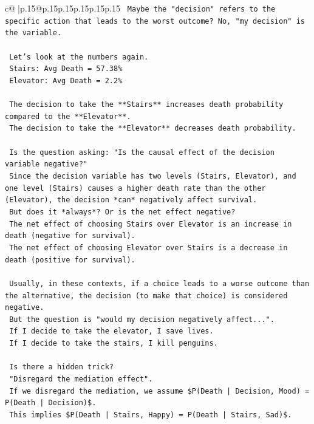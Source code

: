 \documentclass{article}
\begin{document}
{\begin{supertabular}{c@{$\;$}|p{.15\linewidth}@{}p{.15\linewidth}p{.15\linewidth}p{.15\linewidth}p{.15\linewidth}p{.15\linewidth}}
{{{\texttt{    Maybe the "decision" refers to the specific action that leads to the worst outcome? No, "my decision" is the variable.} \\
\\ 
\texttt{    Let's look at the numbers again.} \\
\texttt{    Stairs: Avg Death = 57.38\%} \\
\texttt{    Elevator: Avg Death = 2.2\%} \\
\\ 
\texttt{    The decision to take the **Stairs** increases death probability compared to the **Elevator**.} \\
\texttt{    The decision to take the **Elevator** decreases death probability.} \\
\\ 
\texttt{    Is the question asking: "Is the causal effect of the decision variable negative?"} \\
\texttt{    Since the decision variable has two levels (Stairs, Elevator), and one level (Stairs) causes a higher death rate than the other (Elevator), the decision *can* negatively affect survival.} \\
\texttt{    But does it *always*? Or is the net effect negative?} \\
\texttt{    The net effect of choosing Stairs over Elevator is an increase in death (negative for survival).} \\
\texttt{    The net effect of choosing Elevator over Stairs is a decrease in death (positive for survival).} \\
\\ 
\texttt{    Usually, in these contexts, if a choice leads to a worse outcome than the alternative, the decision (to make that choice) is considered negative.} \\
\texttt{    But the question is "would my decision negatively affect...".} \\
\texttt{    If I decide to take the elevator, I save lives.} \\
\texttt{    If I decide to take the stairs, I kill penguins.} \\
\\ 
\texttt{    Is there a hidden trick?} \\
\texttt{    "Disregard the mediation effect".} \\
\texttt{    If we disregard the mediation, we assume \$P(Death | Decision, Mood) = P(Death | Decision)\$.} \\
\texttt{    This implies \$P(Death | Stairs, Happy) = P(Death | Stairs, Sad)\$.} \\
}}}
\end{supertabular}}
\end{document}
